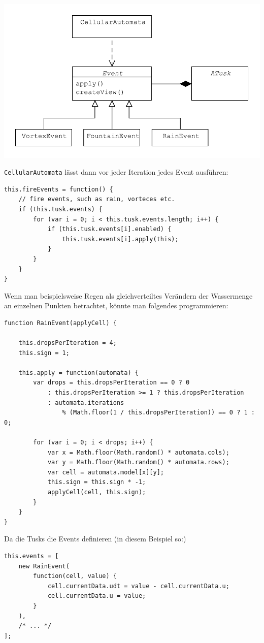 \documentclass[11pt]{report} %
\theoremstyle{definition}
\begin{document}
\includegraphics[scale=0.7]{uml/Events.pdf}

{\tt CellularAutomata} lässt dann vor jeder Iteration jedes Event ausführen:

\begin{lstlisting}
this.fireEvents = function() {
	// fire events, such as rain, vorteces etc.
	if (this.tusk.events) {
		for (var i = 0; i < this.tusk.events.length; i++) {
			if (this.tusk.events[i].enabled) {
				this.tusk.events[i].apply(this);
			}
		}
	}
}
\end{lstlisting}

Wenn man beispielsweise Regen als gleichverteiltes Verändern der Wassermenge an einzelnen Punkten betrachtet, könnte man folgendes programmieren:

\begin{lstlisting}
function RainEvent(applyCell) {

	this.dropsPerIteration = 4;
	this.sign = 1;
	
	this.apply = function(automata) {
		var drops = this.dropsPerIteration == 0 ? 0
			: this.dropsPerIteration >= 1 ? this.dropsPerIteration
			: automata.iterations
				% (Math.floor(1 / this.dropsPerIteration)) == 0 ? 1 : 0;
		
		for (var i = 0; i < drops; i++) {
			var x = Math.floor(Math.random() * automata.cols);
			var y = Math.floor(Math.random() * automata.rows);
			var cell = automata.model[x][y];
			this.sign = this.sign * -1;
			applyCell(cell, this.sign);
		}
	}
}
\end{lstlisting}

Da die Tusks die Events definieren (in diesem Beispiel so:)

\begin{lstlisting}
this.events = [
	new RainEvent(
		function(cell, value) {
			cell.currentData.udt = value - cell.currentData.u;
			cell.currentData.u = value;
		}
	),
 	/* ... */
];
\end{lstlisting}
\end{document}
